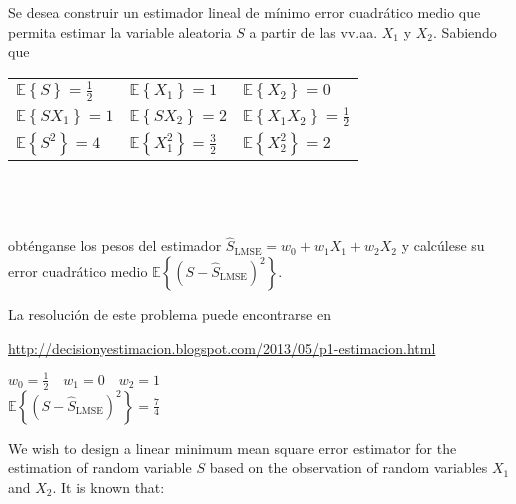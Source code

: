 \ifspanish

\question Se desea construir un estimador lineal de mínimo error cuadrático medio que permita estimar la variable aleatoria $S$ a partir de las vv.aa. $X_1$ y $X_2$. Sabiendo que\\

\begin{tabular}{lll}
$\mathbb E\left\lbrace S \right\rbrace=\displaystyle\frac{1}{2}$ & $\mathbb E\left\lbrace X_1 \right\rbrace=1$  & $\mathbb E\left\lbrace X_2 \right\rbrace=0$  \\

$\mathbb E\left\lbrace SX_1 \right\rbrace=1$ & $\mathbb E\left\lbrace SX_2 \right\rbrace=2$  & $\mathbb E\left\lbrace X_1X_2 \right\rbrace=\displaystyle\frac{1}{2}$  \\

$\mathbb E\left\lbrace S^2 \right\rbrace=4$ & $\mathbb E\left\lbrace X_1^2 \right\rbrace=\displaystyle\frac{3}{2}$  & $\mathbb E\left\lbrace X_2^2 \right\rbrace=2$  
\end{tabular}
\\ ~\\ ~\\
obténganse los pesos del estimador  $\hat{S}_\text{LMSE}=w_0+w_{1}X_1+w_2X_2$ y calcúlese su error cuadrático medio $\mathbb E\left\lbrace(S-\hat{S}_\text{LMSE})^2\right\rbrace$.

\begin{solution}
La resolución de este problema puede encontrarse en 

\url{http://decisionyestimacion.blogspot.com/2013/05/p1-estimacion.html} 

$ w_0=\displaystyle\frac{1}{2} \quad w_1=0 \quad w_2=1$\\
$\mathbb E\left\lbrace(S-\hat{S}_\text{LMSE})^2\right\rbrace=\displaystyle\frac{7}{4}$
\end{solution}

\else

\question We wish to design a linear minimum mean square error estimator for the estimation of random variable $S$ based on the observation of random variables $X_1$ and $X_2$. It is known that:\\

